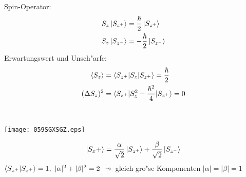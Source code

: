 \documentclass[a4paper]{scrartcl}
\begin{document}
{\begin{aaufz}
Spin-Operator:
\begin{align}
\begin{split}
S_z \ket{ S_{z^+}} & = \frac \hbar 2 \ket{ S_{z^+}} \\
S_z \ket{S_{z^-}} & = - \frac \hbar 2 \ket{S_{z^-}}
\end{split}
\end{align}
Erwartungswert und Unsch"arfe:
\begin{align}
\braket{ S_z }& = \braket{ S_{z^+} | S_z | S_{z^+}} = \frac \hbar 2 \\
(\Delta S_z)^2 & = \braket { S_{z^+}  | S_z^2 - \frac {\hbar^2}4 | S_{z^+}} = 0 \notag
\end{align}
\item \
\begin{center}
\texttt{[image: 059SGXSGZ.eps]}
\end{center}
$$\ket {S_x+} = \frac \alpha {\sqrt2} \ket{S_{z^+}} + \frac \beta {\sqrt2} \ket{S_{z^-}}$$
$\braket{ S_{x^+} | S_{x^+}} = 1, \ \vert \alpha \vert ^2 + \vert \beta \vert ^2 = 2$ $\leadsto$ gleich gro"se Komponenten $\vert \alpha \vert = \vert \beta \vert = 1$


\end{aaufz}}
\end{document}
